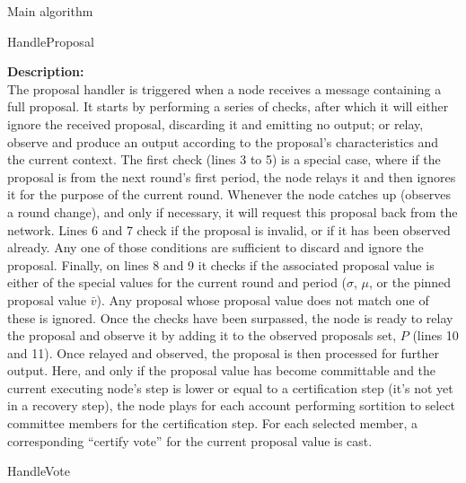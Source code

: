 \documentclass[10pt,a4paper]{article}
\begin{document}
\begin{section}{Main algorithm}
\begin{subsection}{HandleProposal}
    
    \noindent \textbf{Description:}\\
The proposal handler is triggered when a node receives a message containing a full proposal.
It starts by performing a series of checks, after which it will either ignore the received
proposal, discarding it and emitting no output; or relay, observe and produce an output
according to the proposal's characteristics and the current context.
The first check (lines 3 to 5) is a special case, where if the proposal is from the next round's 
first period, the node relays it and then ignores it for the purpose of the current round. 
Whenever the node catches up (observes a round change), and only if necessary, it will request 
this proposal back from the network.
Lines 6 and 7 check if the proposal is invalid, or if it has been observed already. Any one of those
conditions are sufficient to discard and ignore the proposal.
Finally, on lines 8 and 9 it checks if the associated proposal value is either of the special values for the current
round and period ($\sigma$, $\mu$, or the pinned proposal value $\bar{v}$). Any proposal whose proposal value does not match
one of these is ignored.
Once the checks have been surpassed, the node is ready to relay the proposal and observe it by adding
it to the observed proposals set, $P$ (lines 10 and 11).
Once relayed and observed, the proposal is then processed for further output.
Here, and only if the proposal value has become committable and the current executing node's step is lower or equal
to a certification step (it's not yet in a recovery step), the node plays for each account performing sortition
to select committee members for the certification step. 
For each selected member, a corresponding ``certify vote'' for the current proposal value is cast.


\end{subsection}


\begin{subsection}{HandleVote}\label{ssect:HandleVote}

    \begin{algorithm}[H]
        \caption{\underline{HandleVote}}
        \label{algo:handle-vote}
        \begin{algorithmic}[1]

            

\end{algorithmic}
\end{algorithm}
\end{subsection}
\end{section}
\end{document}
